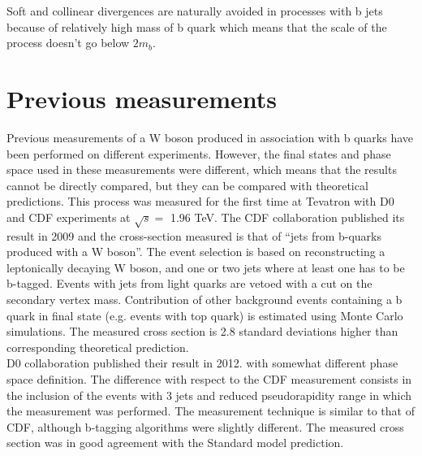 \par Soft and collinear divergences are naturally avoided in processes with b jets because of relatively high mass of b quark which means that the scale of the process doesn't go below $2m_b$.  



\section{Previous measurements}

	\par Previous measurements of a W boson produced in association with b quarks have been performed on different experiments. However, the final states and phase space used in these measurements were different, which means that the results cannot be directly compared, but they can be compared with theoretical predictions. This process was measured for the first time at Tevatron with D0 and CDF experiments at $\sqrt{s} =$ 1.96 TeV. The CDF collaboration published its result in 2009 and the cross-section measured is that of “jets from b-quarks produced with a W boson”\citep{Aaltonen:2009qi}. The event selection is based on reconstructing a leptonically decaying W boson, and one or two jets where at least one has to be b-tagged. Events with jets from light quarks are vetoed with a cut on the secondary vertex mass. Contribution of other background events containing a b quark in final state (e.g. events with top quark) is estimated using Monte Carlo simulations. The measured cross section is 2.8 standard deviations higher than corresponding theoretical prediction. \\
	D0 collaboration published their result in 2012. with somewhat different phase space definition\citep{D0:2012qt}. The difference with respect to the CDF measurement consists in the inclusion of the events with 3 jets and reduced pseudorapidity range in which the measurement was performed. The measurement technique is similar to that of CDF, although b-tagging algorithms were slightly different. The measured cross section was in good agreement with the Standard model prediction.\\
